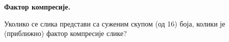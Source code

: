 \item{} \textbf{Фактор компресије.}

Уколико се слика представи са суженим скупом (од 16) боја, колики је (приближно) фактор компресије слике?

